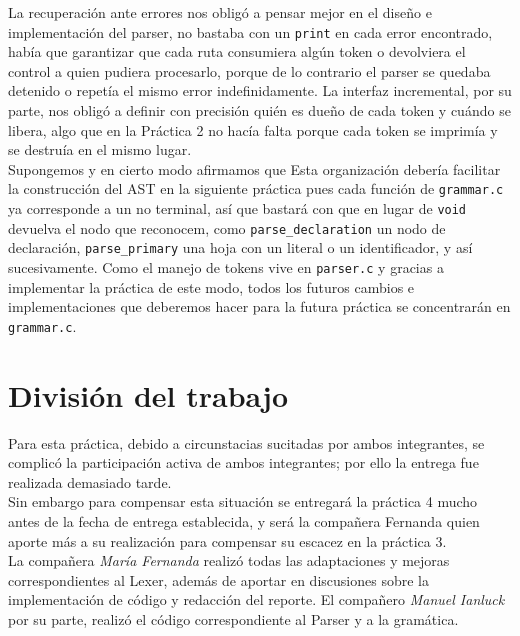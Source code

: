 \documentclass[12pt,letterpaper]{article}
\begin{document}
La recuperación ante errores nos obligó a pensar mejor en el diseño e implementación del parser, no bastaba con
un \texttt{print} en cada error encontrado, había que garantizar que cada ruta consumiera algún token o
devolviera el control a quien pudiera procesarlo, porque de lo contrario el parser se quedaba detenido o
repetía el mismo error indefinidamente. La interfaz incremental, por su parte, nos obligó a definir
con precisión quién es dueño de cada token y cuándo se libera, algo que en la Práctica 2 no hacía falta porque
cada token se imprimía y se destruía en el mismo lugar.\\

Supongemos y en cierto modo afirmamos que Esta organización debería facilitar la construcción del AST en la
siguiente práctica pues cada función de \texttt{grammar.c} ya corresponde a un no terminal, así que bastará con
que en lugar de \texttt{void} devuelva el nodo que reconocem, como \texttt{parse\_declaration} un nodo de
declaración, \texttt{parse\_primary} una hoja con un literal o un identificador, y así sucesivamente. Como el
manejo de tokens vive en \texttt{parser.c} y gracias a implementar la práctica de este modo, todos los futuros
cambios e implementaciones que deberemos hacer para la futura práctica se concentrarán en \texttt{grammar.c}.



\bigskip


\section*{División del trabajo}

Para esta práctica, debido a circunstacias sucitadas por ambos integrantes, se complicó la participación
activa de ambos integrantes; por ello la entrega fue realizada demasiado tarde.\\

Sin embargo para compensar esta situación se entregará la práctica 4 mucho antes de la fecha de entrega
establecida, y será la compañera Fernanda quien aporte más a su realización para compensar su escacez en la
práctica 3.\\

La compañera \textit{María Fernanda} realizó todas las adaptaciones y mejoras correspondientes al Lexer,
además de aportar en discusiones sobre la implementación de código y redacción del reporte. El compañero
\textit{Manuel Ianluck} por su parte, realizó el código correspondiente al Parser y a la gramática.\\
\end{document}
